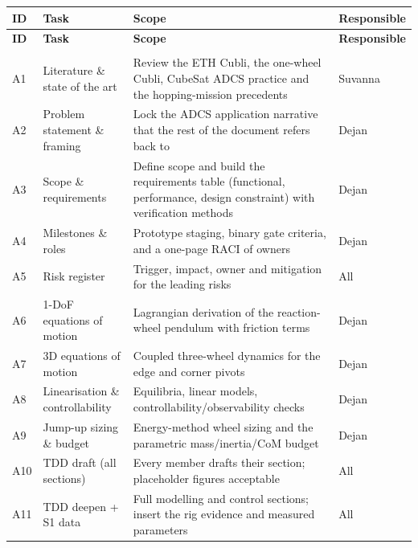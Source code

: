 
{\small
\setlength{\tabcolsep}{4pt}%
\begin{longtable}{@{}L{0.8cm} L{3.5cm} L{7.5cm} L{2.2cm}@{}}
\toprule
\textbf{ID} & \textbf{Task} & \textbf{Scope} & \textbf{Responsible} \\
\midrule\endfirsthead
\toprule
\textbf{ID} & \textbf{Task} & \textbf{Scope} & \textbf{Responsible} \\
\midrule\endhead
\bottomrule\endfoot
{} \\
\midrule
A1 & Literature \& state of the art & Review the ETH Cubli, the one-wheel Cubli, CubeSat ADCS practice and the hopping-mission precedents & Suvanna \\
A2 & Problem statement \& framing & Lock the ADCS application narrative that the rest of the document refers back to & Dejan \\
A3 & Scope \& requirements & Define scope and build the requirements table (functional, performance, design constraint) with verification methods & Dejan \\
A4 & Milestones \& roles & Prototype staging, binary gate criteria, and a one-page RACI of owners & Dejan \\
A5 & Risk register & Trigger, impact, owner and mitigation for the leading risks & All \\
A6 & 1-DoF equations of motion & Lagrangian derivation of the reaction-wheel pendulum with friction terms & Dejan \\
A7 & 3D equations of motion & Coupled three-wheel dynamics for the edge and corner pivots & Dejan \\
A8 & Linearisation \& controllability & Equilibria, linear models, controllability/observability checks & Dejan \\
A9 & Jump-up sizing \& budget & Energy-method wheel sizing and the parametric mass/inertia/CoM budget & Dejan \\
A10 & TDD draft (all sections) & Every member drafts their section; placeholder figures acceptable & All \\
A11 & TDD deepen + S1 data & Full modelling and control sections; insert the rig evidence and measured parameters & All \\

\end{longtable}}
